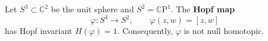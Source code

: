 Let $S^{3} \subset \mathbb{C}^{2}$ be the unit sphere and $S^{2} = \mathbb{C}\mathrm{P}^{1}$. The \textbf{Hopf map}
$$
\varphi \colon S^{3} \to S^{2}, \qquad \varphi(z, w) = [z, w]
$$
has Hopf invariant $H(\varphi) = 1$. Consequently, $\varphi$ is not null homotopic.

